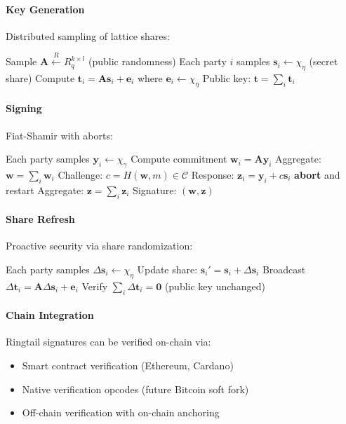 \documentclass[11pt,twocolumn]{article}
\begin{document}
\paragraph{Key Generation} Distributed sampling of lattice shares:
\begin{algorithmic}[1]
\State Sample $\mathbf{A} \xleftarrow{R} R_q^{k \times l}$ (public randomness)
\State Each party $i$ samples $\mathbf{s}_i \leftarrow \chi_\eta$ (secret share)
\State Compute $\mathbf{t}_i = \mathbf{A} \mathbf{s}_i + \mathbf{e}_i$ where $\mathbf{e}_i \leftarrow \chi_\eta$
\State Public key: $\mathbf{t} = \sum_i \mathbf{t}_i$
\end{algorithmic}

\paragraph{Signing} Fiat-Shamir with aborts:
\begin{algorithmic}[1]
\State Each party samples $\mathbf{y}_i \leftarrow \chi_\gamma$
\State Compute commitment $\mathbf{w}_i = \mathbf{A} \mathbf{y}_i$
\State Aggregate: $\mathbf{w} = \sum_i \mathbf{w}_i$
\State Challenge: $c = H(\mathbf{w}, m) \in \mathcal{C}$
\State Response: $\mathbf{z}_i = \mathbf{y}_i + c \mathbf{s}_i$
 \textbf{abort} and restart
\EndIf
\State Aggregate: $\mathbf{z} = \sum_i \mathbf{z}_i$
\State Signature: $(\mathbf{w}, \mathbf{z})$
\end{algorithmic}

\paragraph{Share Refresh} Proactive security via share randomization:
\begin{algorithmic}[1]
\State Each party samples $\Delta \mathbf{s}_i \leftarrow \chi_\eta$
\State Update share: $\mathbf{s}_i' = \mathbf{s}_i + \Delta \mathbf{s}_i$
\State Broadcast $\Delta \mathbf{t}_i = \mathbf{A} \Delta \mathbf{s}_i + \mathbf{e}_i$
\State Verify $\sum_i \Delta \mathbf{t}_i = \mathbf{0}$ (public key unchanged)
\EndFunction
\end{algorithmic}

\paragraph{Chain Integration} Ringtail signatures can be verified on-chain via:
\begin{itemize}
\item Smart contract verification (Ethereum, Cardano)
\item Native verification opcodes (future Bitcoin soft fork)
\item Off-chain verification with on-chain anchoring
\end{itemize}
\end{document}
